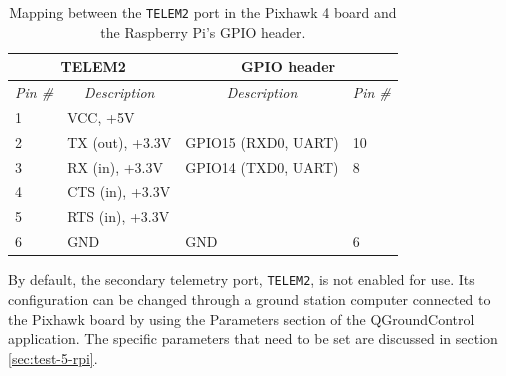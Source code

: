 \begin{table}[ht]
\centering
\begin{tabular}{|ll||ll|}
\hline
\multicolumn{2}{|c||}{\textbf{TELEM2}}                                             & \multicolumn{2}{c|}{\textbf{GPIO header}}                                        \\ \hline \hline
\multicolumn{1}{|c|}{\textit{Pin \#}} & \multicolumn{1}{c||}{\textit{Description}} & \multicolumn{1}{c|}{\textit{Description}} & \multicolumn{1}{c|}{\textit{Pin \#}} \\ \hline
\multicolumn{1}{|l|}{1}               & VCC, +5V                                  & \multicolumn{1}{l|}{}                     &                                      \\ \hline
\multicolumn{1}{|l|}{2}               & TX (out), +3.3V                           & \multicolumn{1}{l|}{GPIO15 (RXD0, UART)}  & 10                                   \\ \hline
\multicolumn{1}{|l|}{3}               & RX (in), +3.3V                            & \multicolumn{1}{l|}{GPIO14 (TXD0, UART)}  & 8                                    \\ \hline
\multicolumn{1}{|l|}{4}               & CTS (in), +3.3V                           & \multicolumn{1}{l|}{}                     &                                      \\ \hline
\multicolumn{1}{|l|}{5}               & RTS (in), +3.3V                           & \multicolumn{1}{l|}{}                     &                                      \\ \hline
\multicolumn{1}{|l|}{6}               & GND                                       & \multicolumn{1}{l|}{GND}                  & 6                                    \\ \hline
\end{tabular}
\caption{Mapping between the \texttt{TELEM2} port in the Pixhawk 4 board and the Raspberry Pi's GPIO header.}
\label{tab:wiring-telem}
\end{table}

By default, the secondary telemetry port, \texttt{TELEM2}, is not enabled for use.
Its configuration can be changed through a ground station computer connected to the Pixhawk board by using the Parameters section of the QGroundControl application.
The specific parameters that need to be set are discussed in section \ref{sec:test-5-rpi}.

